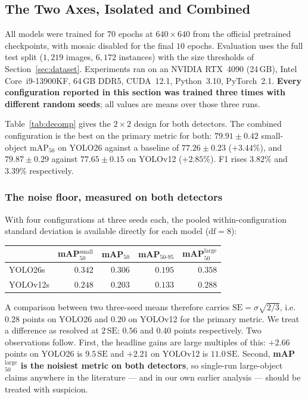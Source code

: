 \documentclass[10pt,twocolumn,a4paper]{article}
\begin{document}
\subsection{The Two Axes, Isolated and Combined}

All models were trained for $70$ epochs at $640\times640$ from the official
pretrained checkpoints, with mosaic disabled for the final $10$ epochs.
Evaluation uses the full test split ($1{,}219$ images, $6{,}172$ instances) with
the size thresholds of Section~\ref{sec:dataset}. Experiments ran on an
NVIDIA RTX~4090 (24\,GB), Intel Core~i9-13900KF, 64\,GB DDR5, CUDA~12.1,
Python~3.10, PyTorch~2.1. \textbf{Every configuration reported in this section
was trained three times with different random seeds}; all values are means over
those three runs.



Table~\ref{tab:decomp} gives the $2\times2$ design for both detectors. The
combined configuration is the best on the primary metric for both:
$79.91 \pm 0.42$ small-object mAP$_{50}$ on YOLO26 against a baseline of
$77.26 \pm 0.23$ ($+3.44\%$), and $79.87 \pm 0.29$ against $77.65 \pm 0.15$ on
YOLOv12 ($+2.85\%$). F1 rises $3.82\%$ and $3.39\%$ respectively.

\subsubsection*{The noise floor, measured on both detectors}

With four configurations at three seeds each, the pooled within-configuration
standard deviation is available directly for each model
($\mathrm{df}=8$):

\begin{center}\small
\begin{tabular}{@{}lrrrr@{}}
\toprule
 & mAP$_{50}^{\text{small}}$ & mAP$_{50}$ & mAP$_{50\text{-}95}$ & mAP$_{50}^{\text{large}}$ \\
\midrule
YOLO26s  & $0.342$ & $0.306$ & $0.195$ & $0.358$ \\
YOLOv12s & $0.248$ & $0.203$ & $0.133$ & $0.288$ \\
\bottomrule
\end{tabular}
\end{center}

\noindent A comparison between two three-seed means therefore carries
$\mathrm{SE} = \sigma\sqrt{2/3}$, i.e.\ $0.28$ points on YOLO26 and $0.20$ on
YOLOv12 for the primary metric. We treat a difference as resolved at
$2\,\mathrm{SE}$: $0.56$ and $0.40$ points respectively. Two observations
follow. First, the headline gains are large multiples of this: $+2.66$ points on
YOLO26 is $9.5\,\mathrm{SE}$ and $+2.21$ on YOLOv12 is $11.0\,\mathrm{SE}$.
Second, \textbf{mAP$_{50}^{\text{large}}$ is the noisiest metric on both
detectors}, so single-run large-object claims anywhere in the literature --- and
in our own earlier analysis --- should be treated with suspicion.
\end{document}
